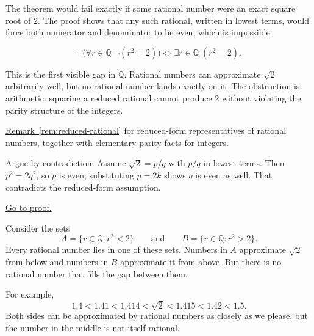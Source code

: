 \begin{remark*}
The theorem would fail exactly if some rational number were an exact square root of $2$.  The proof shows that any such rational, written in lowest terms, would force both numerator and denominator to be even, which is impossible.
\end{remark*}

\begin{remark*}
\[
\neg\bigl(\forall r\in\mathbb{Q}\;\neg(r^2=2)\bigr)
\Longleftrightarrow
\exists r\in\mathbb{Q}\;(r^2=2).
\]
\end{remark*}

\begin{remark*}[Interpretation]
This is the first visible gap in $\mathbb{Q}$.  Rational numbers can approximate $\sqrt{2}$ arbitrarily well, but no rational number lands exactly on it.  The obstruction is arithmetic: squaring a reduced rational cannot produce $2$ without violating the parity structure of the integers.
\end{remark*}

\begin{remark*}[Dependencies]
\hyperref[rem:reduced-rational]{Remark~\ref*{rem:reduced-rational}} for reduced-form representatives of rational numbers, together with elementary parity facts for integers.
\end{remark*}

\begin{remark*}
Argue by contradiction.  Assume $\sqrt{2}=p/q$ with $p/q$ in lowest terms.  Then $p^2=2q^2$, so $p$ is even; substituting $p=2k$ shows $q$ is even as well.  That contradicts the reduced-form assumption.
\end{remark*}

\begin{remark*}[Proof]
\hyperref[prf:sqrt2-irrational]{Go to proof.}
\end{remark*}

\begin{remark}
Consider the sets
\[
A = \{r\in\mathbb{Q}: r^2<2\}
\qquad\text{and}\qquad
B = \{r\in\mathbb{Q}: r^2>2\}.
\]
Every rational number lies in one of these sets.  Numbers in $A$ approximate $\sqrt{2}$ from
below and numbers in $B$ approximate it from above.  But there is no rational number that fills the
gap between them.
\end{remark}

\begin{remark}
For example,
\[
1.4<1.41<1.414<\sqrt{2}<1.415<1.42<1.5.
\]
Both sides can be approximated by rational numbers as closely as we please, but the number in the
middle is not itself rational.
\end{remark}


